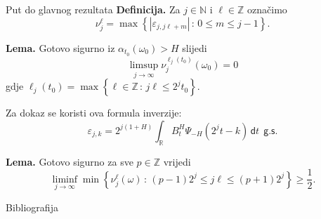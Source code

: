 \documentclass{beamer}
\renewcommand{\mathrm}[1]{\mathsf{#1}}
\newcommand{\ub}{\rightarrow \infty}
\newcommand{\st}{\, \colon \,}
\newcommand{\D}{\,\mathrm d}
\newcommand{\R}{\mathbb{R}}
\newcommand{\N}{\mathbb{N}}
\newcommand{\Z}{\mathbb{Z}}
\newcommand{\mathgs}{\ \ \mathrm{g.s.}}
\newcommand{\abs}[1]{\left| {#1} \right|}
\begin{document}
\begin{frame}[allowframebreaks]{Put do glavnog rezultata}
	\textbf{Definicija.} Za \( j \in \N \) i \( \ell \in \Z \) označimo
	\begin{equation}
		\nu_j^\ell = \max \left\{ \abs{\varepsilon_{j,j\ell+m}} \st 0 \le m \le j-1 \right\}.
	\end{equation}

	\vskip10pt
	\textbf{Lema.} Gotovo sigurno iz \( \alpha_{t_0}(\omega_0) > H \) slijedi
	\begin{equation}
		\limsup\limits_{j \ub} \nu_j^{\ell_j(t_0)}(\omega_0) = 0
	\end{equation}
	gdje \( \ell_j(t_0) = \max\left\{ \ell \in \Z \st j\ell \le 2^jt_0 \right\} \).

	\vskip10pt
	Za dokaz se koristi ova formula inverzije:
	\begin{equation}
		\varepsilon_{j,k} = 2^{j(1+H)}\int_\R B^H_t\Psi_{-H}(2^jt-k) \D t \mathgs
	\end{equation}

	\framebreak
	\textbf{Lema.} Gotovo sigurno za sve \( p \in \Z \) vrijedi
	\begin{equation}
		\liminf\limits_{j \ub} \min \left\{ \nu_j^\ell(\omega) \st
		(p-1)2^j \le j\ell \le (p+1)2^j \right\} \ge \frac 12.
	\end{equation}
\end{frame}


\begin{frame}[t, allowframebreaks]{Bibliografija}
	\printbibliography
\end{frame}
\end{document}
